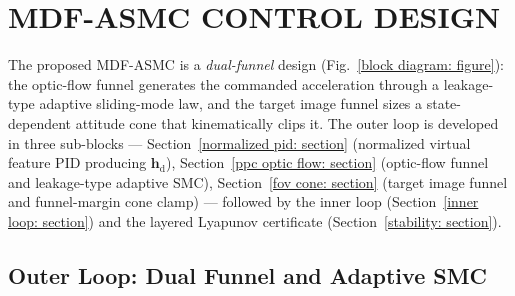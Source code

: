 \section{MDF-ASMC CONTROL DESIGN} \label{control strategy: section}
The proposed MDF-ASMC is a \emph{dual-funnel} design (Fig.~\ref{block diagram: figure}): the optic-flow funnel generates the commanded acceleration through a leakage-type adaptive sliding-mode law, and the target image funnel sizes a state-dependent attitude cone that kinematically clips it. The outer loop is developed in three sub-blocks --- Section~\ref{normalized pid: section} (normalized virtual feature PID producing $\boldsymbol{h}_\text{d}$), Section~\ref{ppc optic flow: section} (optic-flow funnel and leakage-type adaptive SMC), Section~\ref{fov cone: section} (target image funnel and funnel-margin cone clamp) --- followed by the inner loop (Section~\ref{inner loop: section}) and the layered Lyapunov certificate (Section~\ref{stability: section}).

\subsection{Outer Loop: Dual Funnel and Adaptive SMC} \label{outer loop: section}

